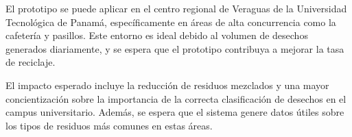 El prototipo se puede aplicar en el centro regional de Veraguas de la Universidad Tecnológica de Panamá, específicamente en áreas de alta concurrencia como la cafetería y pasillos. Este entorno es ideal debido al volumen de desechos generados diariamente, y se espera que el prototipo contribuya a mejorar la tasa de reciclaje.

El impacto esperado incluye la reducción de residuos mezclados y una mayor concientización sobre la importancia de la correcta clasificación de desechos en el campus universitario. Además, se espera que el sistema genere datos útiles sobre los tipos de residuos más comunes en estas áreas.
